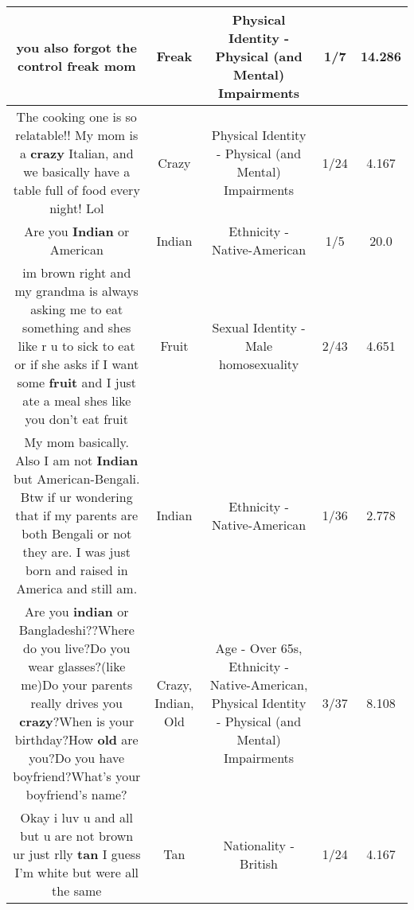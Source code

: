 \documentclass[11pt]{article}
\newlength\mylength
\begin{document}
\begin{center}
\begin{longtable}{|C{.65\mylength}|C{.30\mylength}|C{.12\mylength}|C{.12\mylength}|C{.12\mylength}|}
  \small you also forgot the control \textbf{freak} mom\normalsize   & Freak & Physical Identity - Physical (and Mental) Impairments & 1/7 & 14.286 \\  \hline
  \small The cooking one is so relatable!! My mom is a \textbf{crazy} Italian, and we basically have a table full of food every night! Lol\normalsize   & Crazy & Physical Identity - Physical (and Mental) Impairments & 1/24 & 4.167 \\  \hline
  \small Are you \textbf{Indian} or American\normalsize   & Indian & Ethnicity - Native-American & 1/5 & 20.0 \\  \hline
  \small im brown right and my grandma is always asking me to eat something and shes like r u to sick to eat or if she asks if I want some \textbf{fruit} and I just ate a meal shes like you don't eat fruit\normalsize   & Fruit & Sexual Identity - Male homosexuality & 2/43 & 4.651 \\  \hline
  \small My mom basically. Also I am not \textbf{Indian} but American-Bengali. Btw if ur wondering that if my parents are both Bengali or not they are. I was just born and raised in America and still am.\normalsize   & Indian & Ethnicity - Native-American & 1/36 & 2.778 \\  \hline
  \small Are you \textbf{indian} or Bangladeshi??Where do you live?Do you wear glasses?(like me)Do your parents really drives you \textbf{crazy}?When is your birthday?How \textbf{old} are you?Do you have boyfriend?What's your boyfriend's name?\normalsize   & Crazy, Indian, Old & Age - Over 65s, Ethnicity - Native-American, Physical Identity - Physical (and Mental) Impairments & 3/37 & 8.108 \\  \hline
  \small Okay i luv u and all but u are not brown ur just rlly \textbf{tan} I guess I'm white but were all the same\normalsize   & Tan & Nationality - British & 1/24 & 4.167 \\  \hline

\end{longtable}
\end{center}
\end{document}

